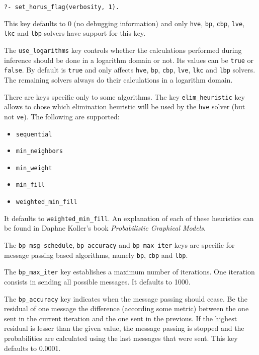 \documentclass{article}
\begin{document}
\texttt{?- set\_horus\_flag(verbosity, 1).}

This key defaults to 0 (no debugging information) and only \texttt{hve}, \texttt{bp}, \texttt{cbp}, \texttt{lve}, \texttt{lkc} and \texttt{lbp} solvers have support for this key.

The \texttt{use\_logarithms} key controls whether the calculations performed during inference should be done in a logarithm domain or not. Its values can be \texttt{true} or \texttt{false}. By default is \texttt{true} and only affects \texttt{hve}, \texttt{bp}, \texttt{cbp}, \texttt{lve}, \texttt{lkc} and \texttt{lbp} solvers. The remaining solvers always do their calculations in a logarithm domain.

There are keys specific only to some algorithms. The key \texttt{elim\_heuristic} key allows to chose which elimination heuristic will be used by the \texttt{hve} solver (but not \texttt{ve}). The following are supported:
\begin{itemize}
 \item \texttt{sequential}
 \item \texttt{min\_neighbors}
 \item \texttt{min\_weight}
 \item \texttt{min\_fill}
 \item \texttt{weighted\_min\_fill}
\end{itemize}

It defaults to \texttt{weighted\_min\_fill}. An explanation of each of these heuristics can be found in Daphne Koller's book \textit{Probabilistic Graphical Models}.

The \texttt{bp\_msg\_schedule}, \texttt{bp\_accuracy} and \texttt{bp\_max\_iter} keys are specific for message passing based algorithms, namely \texttt{bp}, \texttt{cbp} and \texttt{lbp}.

The \texttt{bp\_max\_iter} key establishes a maximum number of iterations. One iteration consists in sending all possible messages. It defaults to 1000.

The \texttt{bp\_accuracy} key indicates when the message passing should cease. Be the residual of one message the difference (according some metric) between the one sent in the current iteration and the one sent in the previous. If the highest residual is lesser than the given value, the message passing is stopped and the probabilities are calculated using the last messages that were sent. This key defaults to 0.0001.
\end{document}

